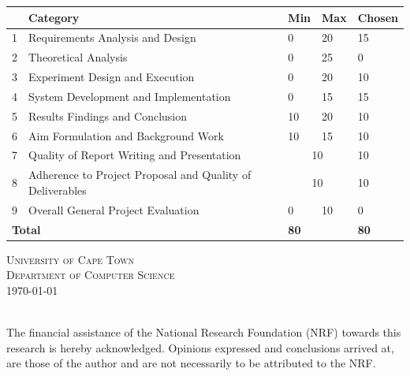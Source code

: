 \begin{titlepage}
\begin{center}
\vfill
\begin{table}[h]
\centering
\begin{tabular}{|l|p{7.5cm}|l|l|l|}
\hline
& \textbf{Category} & \textbf{Min} & \textbf{Max} & \textbf{Chosen} \\
\hline
1 & Requirements Analysis and Design & 0 & 20 & 15 \\
\hline
2 & Theoretical Analysis & 0 & 25 & 0 \\
\hline
3 & Experiment Design and Execution & 0 & 20 & 10 \\
\hline
4 & System Development and Implementation & 0 & 15 & 15 \\
\hline
5 & Results Findings and Conclusion & 10 & 20 & 10 \\
\hline
6 & Aim Formulation and Background Work & 10 & 15 & 10 \\
\hline
7 & Quality of Report Writing and Presentation &
\multicolumn{2}{|c|}{10}  & 10 \\
\hline
8 & Adherence to Project Proposal and Quality of Deliverables &
\multicolumn{2}{|c|}{10}  & 10 \\
\hline
9 & Overall General Project Evaluation & 0 & 10 & 0 \\
\hline
\multicolumn{2}{|l|}{\textbf{Total}} & \multicolumn{2}{|l|}{\textbf{80}} & \textbf{80} \\
\hline
\end{tabular}
\end{table}




\textsc{\Large University of Cape Town}\\[0.5cm]
\textsc{\Large Department of Computer Science}\\[0.5cm]
{\large \today} \\
\end{center}
\HRule \\[0.2cm]
{\raggedleft The financial assistance of the National Research Foundation (NRF) towards this research is hereby acknowledged. Opinions
expressed and conclusions arrived at, are those of the author and are not necessarily to be attributed to the NRF.}\\
\HRule \\[0.2cm]



\end{titlepage}
